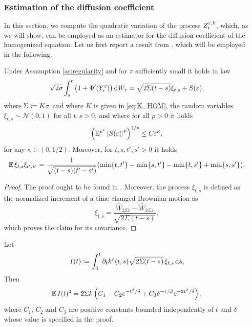 \documentclass[10pt]{article}
\begin{document}
\subsubsection{Estimation of the diffusion coefficient}\label{sec:Sigma}

In this section, we compute the quadratic variation of the process $Z_t^{\varepsilon, k}$, which, as we will show, can be employed as an estimator for the diffusion coefficient of the homogenized equation. Let us first report a result from \cite{PaS07}, which will be employed in the following.
\begin{lemma}\label{lem:Sigma} Under Assumption \ref{as:regularity} and for $\varepsilon$ sufficiently small it holds in law
	\begin{equation}
		\sqrt{2\sigma}\int_s^t \big(1 + \Phi'(Y^\varepsilon_r)\big) \,\mathrm{d} W_r = \sqrt{2\Sigma(t-s)} \xi_{t,s} + S(\varepsilon),
	\end{equation}
	where $\Sigma \coloneqq K \sigma$ and where $K$ is given in \eqref{eq:K_HOM}, the random variables $\xi_{t,s} \sim \mathcal N(0, 1)$ for all $t, s > 0$, and where for all $p > 0$ it holds
	\begin{equation}
		\left(\operatorname{\mathbb{E}}^{\mu^\varepsilon}\left\lvert S(\varepsilon)\right\rvert^p\right)^{1/p} \leq C \varepsilon^\kappa,
	\end{equation}
	for any $\kappa \in (0, 1/2)$. Moreover, for $t, s, t', s' > 0$ it holds
	\begin{equation}
		\operatorname{\mathbb{E}} \xi_{t,s} \xi_{t',s'} = \frac1{\sqrt{(t-s)(t'-s')}} (\min\{t, t'\} - \min\{s, t'\} - \min\{t,s'\} + \min\{s,s'\}).
	\end{equation}
\end{lemma}
\begin{proof} The proof ought to be found in \cite[Proposition 5.8]{PaS07}. Moreover, the process $\xi_{t,s}$ is defined as the normalized increment of a time-changed Brownian motion as
	\begin{equation}
		\xi_{t,s} = \frac{\widehat W_{2\Sigma t} - \widehat W_{2\Sigma s}}{\sqrt{2\Sigma (t-s)}}, 
	\end{equation}
	which proves the claim for its covariance.
\end{proof}

\begin{lemma}\label{lem:diffusionLemma} Let
	\begin{equation}
		I(t) \coloneqq \int_0^t \partial_t k^\varepsilon(t, s) \sqrt{2\Sigma(t-s)} \, \xi_{t,s} \,\mathrm{d} s,
	\end{equation}
	 Then
	\begin{equation}
		\operatorname{\mathbb{E}} I(t)^2 = 2 \Sigma \bar k  \left( C_1 - C_2 e^{-t^\beta/\delta} + C_3 \delta^{-1/\beta} e^{-2t^\beta/\delta}\right),
	\end{equation}
	where $C_1$, $C_2$ and $C_3$ are positive constants bounded independently of $t$ and $\delta$ whose value is specified in the proof.
\end{lemma}
\end{document}
